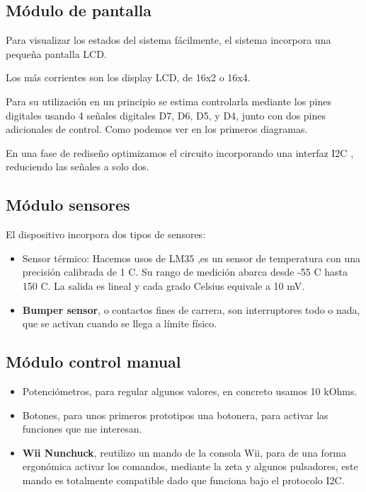 \subsection{Módulo de pantalla}

Para visualizar los estados del sistema fácilmente, el sistema incorpora una pequeña pantalla LCD. 

Los más corrientes son los display LCD, de 16x2 o 16x4.

Para su utilización en un principio se estima controlarla mediante los pines digitales usando 4 señales digitales D7, D6, D5, y D4, junto con dos pines adicionales de control. Como podemos ver en los primeros diagramas.

En una fase de rediseño optimizamos el circuito incorporando una interfaz I2C \cite{I2C}, reduciendo las señales a solo dos. 


\subsection{Módulo sensores}

El dispositivo incorpora dos tipos de sensores:

\begin{itemize}
	\item Sensor térmico: Hacemos usos de  LM35 \cite{LM35},es un sensor de temperatura con una precisión calibrada de 1 \grad C. Su rango de medición abarca desde -55 \grad C hasta 150 \grad C. La salida es lineal y cada grado Celsius equivale a 10 mV.
	\item \textbf{Bumper sensor}, o contactos fines de carrera, son interruptores todo o nada, que se activan cuando se llega a límite físico. 
\end{itemize}


\subsection{Módulo control manual}

\begin{itemize}
	\item Potenciómetros, para regular algunos valores, en concreto usamos 10 kOhms.
	
	\item Botones, para unos primeros prototipos una botonera, para activar las funciones que me interesan.
	
	\item \textbf{Wii Nunchuck}, reutilizo un mando de la consola Wii, para de una forma ergonómica activar los comandos, mediante la zeta y algunos pulsadores, este mando es totalmente compatible dado que funciona bajo el protocolo I2C.
	 
\end{itemize}


